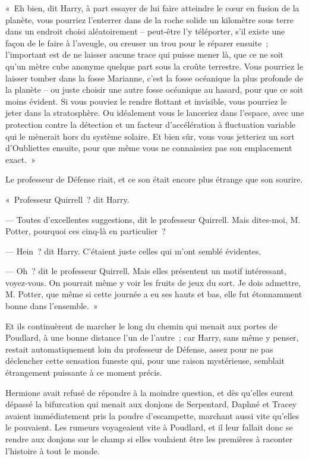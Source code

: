«~Eh bien, dit Harry, à part essayer de lui faire atteindre le cœur en fusion de la planète, vous pourriez l'enterrer dans de la roche solide un kilomètre sous terre dans un endroit choisi aléatoirement -- peut-être l'y téléporter, s'il existe une façon de le faire à l'aveugle, ou creuser un trou pour le réparer ensuite~; l'important est de ne laisser aucune trace qui puisse mener là, que ce ne soit qu'un mètre cube anonyme quelque part sous la croûte terrestre.
Vous pourriez le laisser tomber dans la fosse Marianne, c'est la fosse océanique la plus profonde de la planète -- ou juste choisir une autre fosse océanique au hasard, pour que ce soit moins évident.
Si vous pouviez le rendre flottant et invisible, vous pourriez le jeter dans la stratosphère.
Ou idéalement vous le lanceriez dans l'espace, avec une protection contre la détection et un facteur d'accélération à fluctuation variable qui le mènerait hors du système solaire.
Et bien sûr, vous vous jetteriez un sort d'Oubliettes ensuite, pour que même vous ne connaissiez pas son emplacement exact.~»

Le professeur de Défense riait, et ce son était encore plus étrange que son sourire.

«~Professeur Quirrell~? dit Harry.

--- Toutes d'excellentes suggestions, dit le professeur Quirrell.
Mais dites-moi, M. Potter, pourquoi ces cinq-là en particulier~?

--- Hein~? dit Harry.
C'étaient juste celles qui m'ont semblé évidentes.

--- Oh~? dit le professeur Quirrell.
Mais elles présentent un motif intéressant, voyez-vous.
On pourrait même y voir les fruits de jeux du sort.
Je dois admettre, M. Potter, que même si cette journée a eu ses hauts et bas, elle fut étonnamment bonne dans l'ensemble.~»

Et ils continuèrent de marcher le long du chemin qui menait aux portes de Poudlard, à une bonne distance l'un de l'autre~; car Harry, sans même y penser, restait automatiquement loin du professeur de Défense, assez pour ne pas déclencher cette sensation funeste qui, pour une raison mystérieuse, semblait étrangement puissante à ce moment précis.


Hermione avait refusé de répondre à la moindre question, et dès qu'elles eurent dépassé la bifurcation qui menait aux donjons de Serpentard, Daphné et Tracey avaient immédiatement pris la poudre d'escampette, marchant aussi vite qu'elles le pouvaient.
Les rumeurs voyageaient vite à Poudlard, et il leur fallait donc se rendre aux donjons sur le champ si elles voulaient être les premières à raconter l'histoire à tout le monde.

